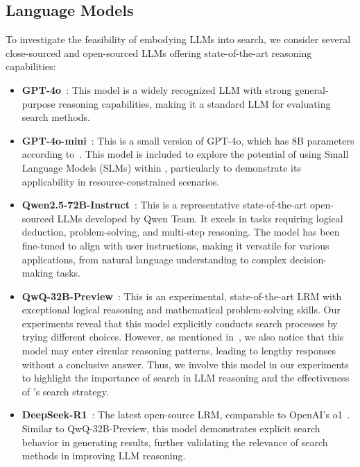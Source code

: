 \subsection{Language Models}
\label{appendix:llm_setting}
To investigate the feasibility of embodying LLMs into search, we consider several close-sourced and open-sourced LLMs offering state-of-the-art reasoning capabilities: 
\begin{itemize}[leftmargin=*]
    \item \textbf{GPT-4o}~\cite{gpt4ocard}: This model is a widely recognized LLM with strong general-purpose reasoning capabilities, making it a standard LLM for evaluating search methods.
    \item \textbf{GPT-4o-mini}~\cite{achiam2023gpt}: This is a small version of GPT-4o, which has 8B parameters according to~\cite{abacha2024medec}. This model is included to explore the potential of using Small Language Models (SLMs) within \method, particularly to demonstrate its applicability in resource-constrained scenarios.
    \item \textbf{Qwen2.5-72B-Instruct}~\cite{qwen2.5}: This is a representative state-of-the-art open-sourced LLMs developed by Qwen Team. It excels in tasks requiring logical deduction, problem-solving, and multi-step reasoning. The model has been fine-tuned to align with user instructions, making it versatile for various applications, from natural language understanding to complex decision-making tasks.
    \item \textbf{QwQ-32B-Preview}~\cite{qwq-32b-preview}: This is an experimental, state-of-the-art LRM with exceptional logical reasoning and mathematical problem-solving skills. Our experiments reveal that this model explicitly conducts search processes by trying different choices. However, as mentioned in~\cite{qwq-32b-preview}, we also notice that this model may enter circular reasoning patterns, leading to lengthy responses without a conclusive answer. Thus, we involve this model in our experiments to highlight the importance of search in LLM reasoning and the effectiveness of \method's search strategy.
    \item \textbf{DeepSeek-R1}~\cite{deepseekai2025deepseekr1}: The latest open-source LRM, comparable to OpenAI's o1~\cite{openaio1card}. Similar to QwQ-32B-Preview, this model demonstrates explicit search behavior in generating results, further validating the relevance of search methods in improving LLM reasoning.
\end{itemize}



